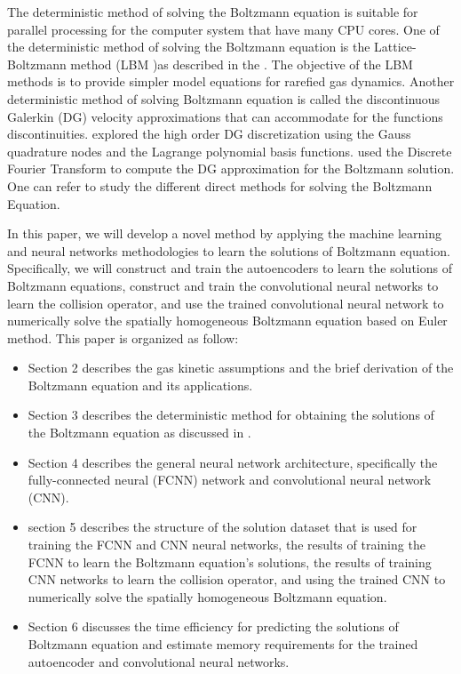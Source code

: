 \documentclass{article}
\begin{document}
The deterministic method of solving the Boltzmann equation is suitable for parallel processing for the computer system that have many CPU cores. One of the deterministic method of solving the Boltzmann equation is the Lattice-Boltzmann method (LBM )as described in the \cite{LBM1, LBM2}. The objective of the LBM methods is to provide simpler model equations for rarefied gas dynamics. Another deterministic method of solving Boltzmann equation is called the discontinuous Galerkin (DG) velocity approximations that can accommodate for the functions discontinuities. \cite{Alekseenko1, Alekseenko2} explored the high order DG discretization using the Gauss quadrature nodes and the Lagrange polynomial basis functions. \cite{Alekseenko4} used the Discrete Fourier Transform to compute the DG approximation for the Boltzmann solution. One can refer \cite{VVAristo} to study the different direct methods for solving the Boltzmann Equation.

In this paper, we will develop a novel method by applying the machine learning and neural networks methodologies to learn the solutions of Boltzmann equation. Specifically, we will construct and train the autoencoders to learn the solutions of Boltzmann equations, construct and train the convolutional neural networks to learn the collision operator, and use the trained convolutional neural network to numerically solve the spatially homogeneous Boltzmann equation based on Euler method. This paper is organized as follow:
\begin{itemize}
	\item Section 2 describes the gas kinetic assumptions and the brief derivation of the Boltzmann equation and its applications.
	\item Section 3 describes the deterministic method for obtaining the solutions of the Boltzmann equation as discussed in \cite{Alekseenko2, Alekseenko4}.
	\item Section 4 describes the general neural network architecture, specifically the fully-connected neural (FCNN) network and convolutional neural network (CNN).
	\item section 5 describes the structure of the solution dataset that is used for training the FCNN and CNN neural networks, the results of training the FCNN to learn the Boltzmann equation's solutions, the results of training CNN networks to learn the collision operator, and using the trained CNN to numerically solve the spatially homogeneous Boltzmann equation.
	\item Section 6 discusses the time efficiency for predicting the solutions of Boltzmann equation and estimate memory requirements for the trained autoencoder and convolutional neural networks.
\end{itemize}
\end{document}

